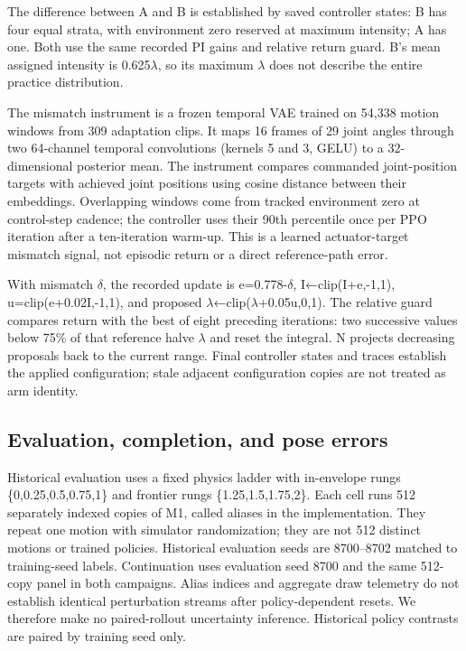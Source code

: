 \documentclass[letterpaper,10pt,conference]{ieeeconf}
\begin{document}
The difference between A and B is established by saved controller states: B has four equal strata, with environment zero reserved at maximum intensity; A has one. Both use the same recorded PI gains and relative return guard. B's mean assigned intensity is 0.625$\lambda$, so its maximum $\lambda$ does not describe the entire practice distribution.

The mismatch instrument is a frozen temporal VAE trained on 54,338 motion windows from 309 adaptation clips. It maps 16 frames of 29 joint angles through two 64-channel temporal convolutions (kernels 5 and 3, GELU) to a 32-dimensional posterior mean. The instrument compares commanded joint-position targets with achieved joint positions using cosine distance between their embeddings. Overlapping windows come from tracked environment zero at control-step cadence; the controller uses their 90th percentile once per PPO iteration after a ten-iteration warm-up. This is a learned actuator-target mismatch signal, not episodic return or a direct reference-path error.

With mismatch $\delta$, the recorded update is e=0.778-$\delta$, I←clip(I+e,-1,1), u=clip(e+0.02I,-1,1), and proposed $\lambda$←clip($\lambda$+0.05u,0,1). The relative guard compares return with the best of eight preceding iterations: two successive values below 75\% of that reference halve $\lambda$ and reset the integral. N projects decreasing proposals back to the current range. Final controller states and traces establish the applied configuration; stale adjacent configuration copies are not treated as arm identity.

\subsection{Evaluation, completion, and pose errors}

Historical evaluation uses a fixed physics ladder with in-envelope rungs \{0,0.25,0.5,0.75,1\} and frontier rungs \{1.25,1.5,1.75,2\}. Each cell runs 512 separately indexed copies of M1, called aliases in the implementation. They repeat one motion with simulator randomization; they are not 512 distinct motions or trained policies. Historical evaluation seeds are 8700--8702 matched to training-seed labels. Continuation uses evaluation seed 8700 and the same 512-copy panel in both campaigns. Alias indices and aggregate draw telemetry do not establish identical perturbation streams after policy-dependent resets. We therefore make no paired-rollout uncertainty inference. Historical policy contrasts are paired by training seed only.
\end{document}
